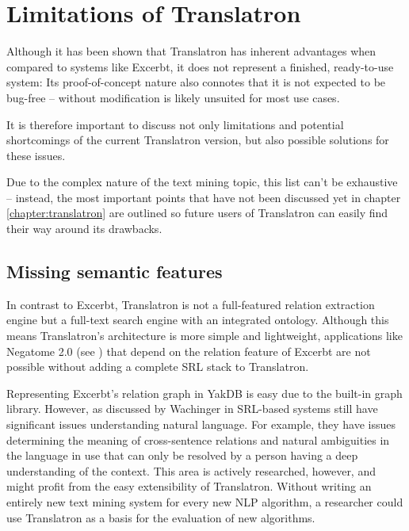 \documentclass[a4paper, 12pt, twoside, reqn]{report}
\numberwithin{figure}{chapter}
\newtheorem[L]{boxedDefinition}{Definition}
\newtheorem[L]{boxedExample}{Example}
\begin{document}
\section{Limitations of Translatron}\label{sec:limitations}

Although it has been shown that Translatron has inherent advantages when compared to systems like Excerbt, it does not represent a finished, ready-to-use system: Its proof-of-concept nature also connotes that it is not expected to be bug-free -- without modification is likely unsuited for most use cases.

It is therefore important to discuss not only limitations and potential shortcomings of the current Translatron version, but also possible solutions for these issues.

Due to the complex nature of the text mining topic, this list can't be exhaustive -- instead, the most important points that have not been discussed yet in chapter \ref{chapter:translatron} are outlined so future users of Translatron can easily find their way around its drawbacks.

\subsection{Missing semantic features}\label{ssec:missing-semantic-features}

In contrast to Excerbt, Translatron is not a full-featured relation extraction engine but a full-text search engine with an integrated ontology. Although this means Translatron's architecture is more simple and lightweight, applications like Negatome 2.0 (see \cite{blohm2013negatome}) that depend on the relation feature of Excerbt are not possible without adding a complete SRL stack to Translatron.

Representing Excerbt's relation graph in YakDB is easy due to the built-in graph library. However, as discussed by Wachinger in \cite{wachinger2013next} SRL-based systems still have significant issues understanding natural language. For example, they have issues determining the meaning of cross-sentence relations and natural ambiguities in the language in use that can only be resolved by a person having a deep understanding of the context. This area is actively researched, however, and might profit from the easy extensibility of Translatron. Without writing an entirely new text mining system for every new NLP algorithm, a researcher could use Translatron as a basis for the evaluation of new algorithms.
\end{document}
